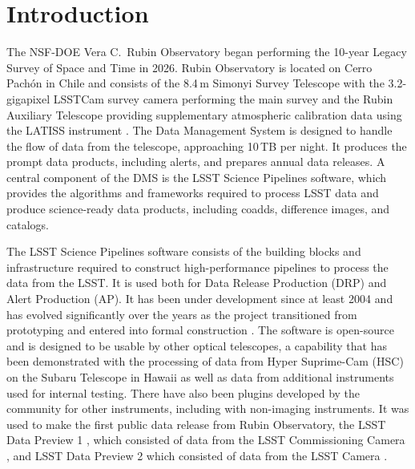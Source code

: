 \section{Introduction}
\label{sec:intro}

The NSF-DOE Vera C.\ Rubin Observatory began performing the 10-year Legacy Survey of Space and Time \citep[LSST;][]{2019ApJ...873..111I} in 2026.
Rubin Observatory is located on Cerro Pach\'on in Chile and consists of the 8.4\,m Simonyi Survey Telescope \citep{2022SPIE12182E..0WT} with the 3.2-gigapixel LSSTCam survey camera \citep{10.71929/rubin/2571927,2024SPIE13096E..1SR} performing the main survey and the Rubin Auxiliary Telescope \citep{2020SPIE11452E..0UI} providing supplementary atmospheric calibration data using the LATISS instrument \citep{10.71929/rubin/2571930}.
The Data Management System \citep[DMS;][]{2025ASPC..538...53O} is designed to handle the flow of data from the telescope, approaching 10\,TB per night.
It produces the prompt data products, including alerts, and prepares annual data releases.
A central component of the DMS is the LSST Science Pipelines software, which provides the algorithms and frameworks required to process LSST data  and produce science-ready data products, including coadds, difference images, and catalogs.

The LSST Science Pipelines software consists of the building blocks and infrastructure required to construct high-performance pipelines to process the data from the LSST.
It is used both for Data Release Production (DRP) and Alert Production (AP).
It has been under development since at least 2004 \citep{2004AAS...20510811A} and has evolved significantly over the years as the project transitioned from prototyping \citep{2010SPIE.7740E..15A} and entered into formal construction \citep{2017ASPC..512..279J}.
The software is open-source and is designed to be usable by other optical telescopes, a capability that has been demonstrated with the processing of data from Hyper Suprime-Cam (HSC) on the Subaru Telescope in Hawaii \citep{2022PASJ...74..247A} as well as data from additional instruments used for internal testing.
There have also been plugins developed by the community for other instruments, including with non-imaging instruments.
It was used to make the first public data release from Rubin Observatory, the LSST Data Preview 1 \citep{2026AJ....171..360V,10.71929/rubin/2570308}, which consisted of data from the LSST Commissioning Camera \citep[LSSTComCam;][]{10.71929/rubin/2561361,2022SPIE12184E..0JS}, and LSST Data Preview 2 \citep[DP2;][]{RTN-115,10.71929/rubin/3382528} which consisted of data from the LSST Camera \citep{10.71929/rubin/2571927}.

